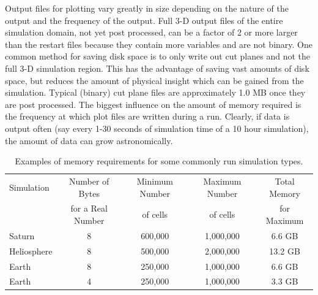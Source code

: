 Output files for plotting vary greatly in size depending on the nature of
the output and the frequency of the output.  Full 3-D output files of
the entire simulation domain, not yet post processed, can be
a factor of 2 or more larger than the restart files because they contain more
variables and are not binary.  
One common method for saving disk space is to only write out cut planes and not
the full 3-D simulation region.  This has the advantage of saving vast
amounts of disk space, but reduces the amount of physical insight
which can be gained from the simulation.  Typical (binary) cut plane
files are approximately 1.0 MB once they are post processed.  
The biggest influence on the amount of memory required is the frequency
at which plot files are written during a run.  Clearly, 
if data is output often (say every 1-30 seconds of simulation
time of a 10 hour simulation), the amount of data can grow astronomically.


\begin{table}[t]

\caption{Examples of memory requirements for some commonly
run simulation types.}

\begin{centering}
{\small
\begin{tabular}{|l|c|c|c|c|} \hline

Simulation  & Number of  Bytes  & Minimum Number  & Maximum Number & Total Memory \\
            & for a Real Number & of cells        & of cells       & for Maximum  \\ 
\hline
Saturn      &  8                & 600,000         & 1,000,000      & 6.6 GB      \\
Heliosphere &  8                & 500,000         & 2,000,000      & 13.2 GB      \\
Earth       &  8                & 250,000         & 1,000,000      & 6.6 GB      \\ 
Earth       &  4                & 250,000         & 1,000,000      & 3.3 GB      \\ 
\hline

\end{tabular}}

\end{centering}

\label{tab:memory}
\end{table} 
